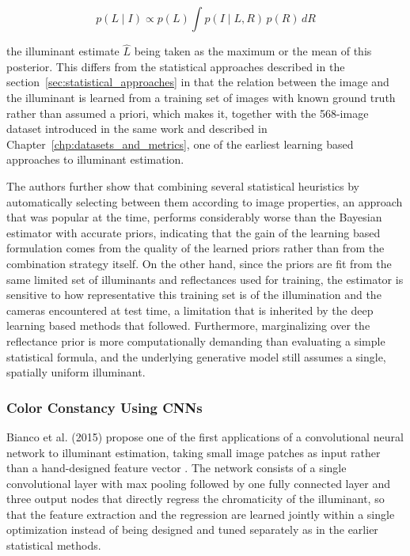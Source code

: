 \begin{equation}
p(L \mid I) \propto p(L) \int p(I \mid L, R) \, p(R) \, dR
\end{equation}

the illuminant estimate $\hat{L}$ being taken as the maximum or the mean of this posterior. This differs from the statistical approaches described in the section~\ref{sec:statistical_approaches} in that the relation between the image and the illuminant is learned from a training set of images with known ground truth rather than assumed a priori, which makes it, together with the 568-image dataset introduced in the same work and described in Chapter~\ref{chp:datasets_and_metrics}, one of the earliest learning based approaches to illuminant estimation.

The authors further show that combining several statistical heuristics by automatically selecting between them according to image properties, an approach that was popular at the time, performs considerably worse than the Bayesian estimator with accurate priors, indicating that the gain of the learning based formulation comes from the quality of the learned priors rather than from the combination strategy itself. On the other hand, since the priors are fit from the same limited set of illuminants and reflectances used for training, the estimator is sensitive to how representative this training set is of the illumination and the cameras encountered at test time, a limitation that is inherited by the deep learning based methods that followed. Furthermore, marginalizing over the reflectance prior is more computationally demanding than evaluating a simple statistical formula, and the underlying generative model still assumes a single, spatially uniform illuminant.

\subsubsection{Color Constancy Using CNNs}

Bianco et al. (2015) propose one of the first applications of a convolutional neural network to illuminant estimation, taking small image patches as input rather than a hand-designed feature vector \cite{bianco2015colorconstancyusingcnns}. The network consists of a single convolutional layer with max pooling followed by one fully connected layer and three output nodes that directly regress the chromaticity of the illuminant, so that the feature extraction and the regression are learned jointly within a single optimization instead of being designed and tuned separately as in the earlier statistical methods.

